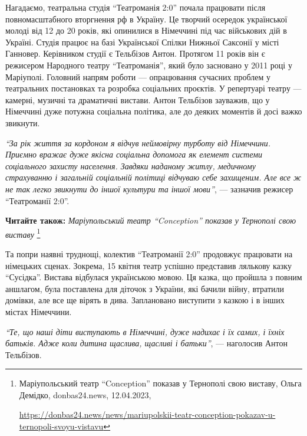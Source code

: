 Нагадаємо, театральна студія \enquote{Театроманія 2:0} почала працювати після
повномасштабного вторгнення рф в Україну. Це творчий осередок української
молоді від 12 до 20 років, які опинилися в Німеччині під час військових дій в
Україні. Студія працює на базі Української Спілки Нижньої Саксонії у місті
Ганновер. Керівником студії є Тельбізов Антон. Протягом 11 років він є
режисером Народного театру \enquote{Театроманія}, який було засновано у 2011 році у
Маріуполі. Головний напрям роботи — опрацювання сучасних проблем у театральних
постановках та розробка соціальних проєктів. У репертуарі театру — камерні,
музичні та драматичні вистави. Антон Тельбізов зауважив, що у Німеччині дуже
потужна соціальна політика, але до деяких моментів й досі важко звикнути.

\begin{leftbar}
\emph{\enquote{За рік життя за кордоном я відчув неймовірну турботу від Німеччини. Приємно
вражає дуже якісна соціальна допомога як елемент системи соціального
захисту населення. Завдяки наданому житлу, медичному страхуванню і
загальній соціальній політиці відчуваю себе захищеним. Але все ж не так
легко звикнути до іншої культури та іншої мови}}, — зазначив режисер
\enquote{Театроманії 2:0}.
\end{leftbar}

\textbf{Читайте також:} \emph{Маріупольський театр \enquote{Conception} показав у Тернополі свою виставу}%
\footnote{Маріупольський театр \enquote{Conception} показав у Тернополі свою виставу, Ольга Демідко, donbas24.news, 12.04.2023, \par%
\url{https://donbas24.news/news/mariupolskii-teatr-conception-pokazav-u-ternopoli-svoyu-vistavu}%
}


Та попри наявні труднощі, колектив \enquote{Театроманії 2:0} продовжує працювати на
німецьких сценах. Зокрема, 15 квітня театр успішно представив лялькову казку
\enquote{Сусідка}. Вистава відбулася українською мовою. Ця казка, що пройшла з повним
аншлагом, була поставлена для діточок з України, які бачили війну, втратили
домівки, але все ще вірять в дива. Заплановано виступити з казкою і в інших
містах Німеччини.

\begin{leftbar}
\emph{\enquote{Те, що наші діти виступають в Німеччині, дуже надихає і їх самих, і їхніх
батьків. Адже коли дитина щаслива, щасливі і батьки}}, — наголосив Антон
Тельбізов.
\end{leftbar}

